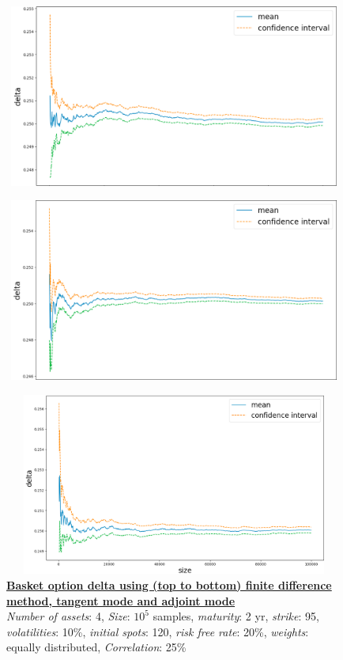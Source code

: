 \documentclass {article}
\begin{document}
			\begin{center}
				\begin{figure}[!h]
					\centering
				        \includegraphics[width=15cm, height=6cm]{stdBasketOptionFiniteDifferenceMethodDelta.png}
				\end{figure}
			\end{center}
			
			
			\begin{center}
				\begin{figure}[!h]
					\centering
				            \includegraphics[width=15cm, height=6cm]{stdBasketOptionTangentModeDelta.png}
				\end{figure}
			\end{center}

			\begin{center}
				\begin{figure}[!h]
					\centering
				            \includegraphics[width=15cm, height=6cm]{stdBasketOptionAdjointModeDelta.png}
							\caption{\textbf{\underline{Basket option delta using (top to bottom) finite difference method, tangent mode and adjoint mode}} 
							\\ \textit{Number of assets}: 4, \textit{Size}: $10^{5}$ samples, \textit{maturity}: 2 yr, \textit{strike}: 95, \textit{volatilities}: 10\%, \textit{initial spots}: 120, \textit{risk free rate}: 20\%, \textit{weights}: equally distributed, \textit{Correlation}: 25\%}
				\end{figure}
			\end{center}
\end{document}
